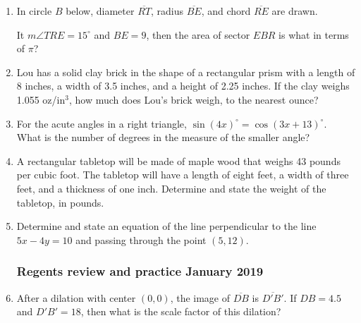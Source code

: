 \documentclass[12pt, oneside]{article}
\begin{document}
\begin{enumerate}[itemsep=0.5cm]
\item In circle $B$ below, diameter $\overline{RT}$, radius $\overline{BE}$, and chord $\overline{RE}$ are drawn.
\begin{center}
  \end{center}
  It $m\angle TRE = 15^\circ$ and $BE=9$, then the area of sector $EBR$ is what in terms of $\pi$?

\item Lou has a solid clay brick in the shape of a rectangular prism with a length of 8 inches, a width of 3.5 inches, and a height of 2.25 inches. If the clay weighs 1.055 oz/in$^3$, how much does Lou's brick weigh, to the nearest ounce? 

\item For the acute angles in a right triangle, $\sin (4x)^\circ =\cos (3x +13)^\circ$. \\
What is the number of degrees in the measure of the smaller angle?

\item A rectangular tabletop will be made of maple wood that weighs 43 pounds per cubic foot. The tabletop will have a length of eight feet, a width of three feet, and a thickness of one inch. Determine and state the weight of the tabletop, in pounds.

\item Determine and state an equation of the line perpendicular to the line\\ $5x-4y=10$ and passing through the point $(5,12)$.

\subsubsection*{Regents review and practice \hfill January 2019}
\item After a dilation with center $(0,0)$, the image of $\overline{DB}$ is $\overline{D'B'}$. If $DB=4.5$ and $D'B'=18$, then what is the scale factor of this dilation?


\end{enumerate}
\end{document}
